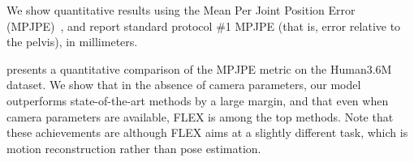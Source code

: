  
We show quantitative results using the Mean Per Joint Position Error (MPJPE)~\cite{h36m_pami,IonescuSminchisescu11}, 
and report standard protocol \#1 MPJPE (that is, error relative to the pelvis), in millimeters.

 presents a quantitative comparison of the MPJPE metric on the Human3.6M~\cite{h36m_pami} dataset. 
We show that in the absence of camera parameters, our model outperforms state-of-the-art methods by a large margin, and that even when camera parameters are available, 
FLEX is among the top methods. Note that these achievements are although FLEX aims at a slightly different task, which is motion reconstruction rather than pose estimation.

